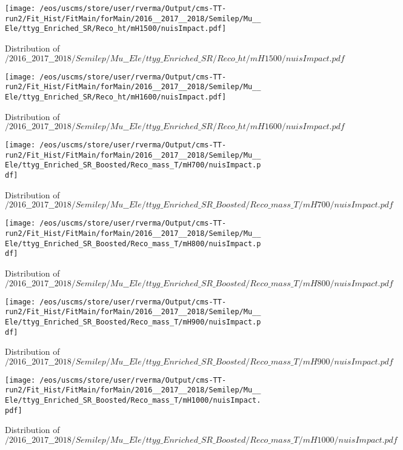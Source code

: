 \begin{figure}
\centering
\texttt{[image: /eos/uscms/store/user/rverma/Output/cms-TT-run2/Fit\_Hist/FitMain/forMain/2016\_\_2017\_\_2018/Semilep/Mu\_\_Ele/ttyg\_Enriched\_SR/Reco\_ht/mH1500/nuisImpact.pdf]}
\caption{Distribution of $/2016\_\_2017\_\_2018/Semilep/Mu\_\_Ele/ttyg\_Enriched\_SR/Reco\_ht/mH1500/nuisImpact.pdf$}
\end{figure}

\begin{figure}
\centering
\texttt{[image: /eos/uscms/store/user/rverma/Output/cms-TT-run2/Fit\_Hist/FitMain/forMain/2016\_\_2017\_\_2018/Semilep/Mu\_\_Ele/ttyg\_Enriched\_SR/Reco\_ht/mH1600/nuisImpact.pdf]}
\caption{Distribution of $/2016\_\_2017\_\_2018/Semilep/Mu\_\_Ele/ttyg\_Enriched\_SR/Reco\_ht/mH1600/nuisImpact.pdf$}
\end{figure}

\begin{figure}
\centering
\texttt{[image: /eos/uscms/store/user/rverma/Output/cms-TT-run2/Fit\_Hist/FitMain/forMain/2016\_\_2017\_\_2018/Semilep/Mu\_\_Ele/ttyg\_Enriched\_SR\_Boosted/Reco\_mass\_T/mH700/nuisImpact.pdf]}
\caption{Distribution of $/2016\_\_2017\_\_2018/Semilep/Mu\_\_Ele/ttyg\_Enriched\_SR\_Boosted/Reco\_mass\_T/mH700/nuisImpact.pdf$}
\end{figure}

\begin{figure}
\centering
\texttt{[image: /eos/uscms/store/user/rverma/Output/cms-TT-run2/Fit\_Hist/FitMain/forMain/2016\_\_2017\_\_2018/Semilep/Mu\_\_Ele/ttyg\_Enriched\_SR\_Boosted/Reco\_mass\_T/mH800/nuisImpact.pdf]}
\caption{Distribution of $/2016\_\_2017\_\_2018/Semilep/Mu\_\_Ele/ttyg\_Enriched\_SR\_Boosted/Reco\_mass\_T/mH800/nuisImpact.pdf$}
\end{figure}

\begin{figure}
\centering
\texttt{[image: /eos/uscms/store/user/rverma/Output/cms-TT-run2/Fit\_Hist/FitMain/forMain/2016\_\_2017\_\_2018/Semilep/Mu\_\_Ele/ttyg\_Enriched\_SR\_Boosted/Reco\_mass\_T/mH900/nuisImpact.pdf]}
\caption{Distribution of $/2016\_\_2017\_\_2018/Semilep/Mu\_\_Ele/ttyg\_Enriched\_SR\_Boosted/Reco\_mass\_T/mH900/nuisImpact.pdf$}
\end{figure}

\begin{figure}
\centering
\texttt{[image: /eos/uscms/store/user/rverma/Output/cms-TT-run2/Fit\_Hist/FitMain/forMain/2016\_\_2017\_\_2018/Semilep/Mu\_\_Ele/ttyg\_Enriched\_SR\_Boosted/Reco\_mass\_T/mH1000/nuisImpact.pdf]}
\caption{Distribution of $/2016\_\_2017\_\_2018/Semilep/Mu\_\_Ele/ttyg\_Enriched\_SR\_Boosted/Reco\_mass\_T/mH1000/nuisImpact.pdf$}
\end{figure}

